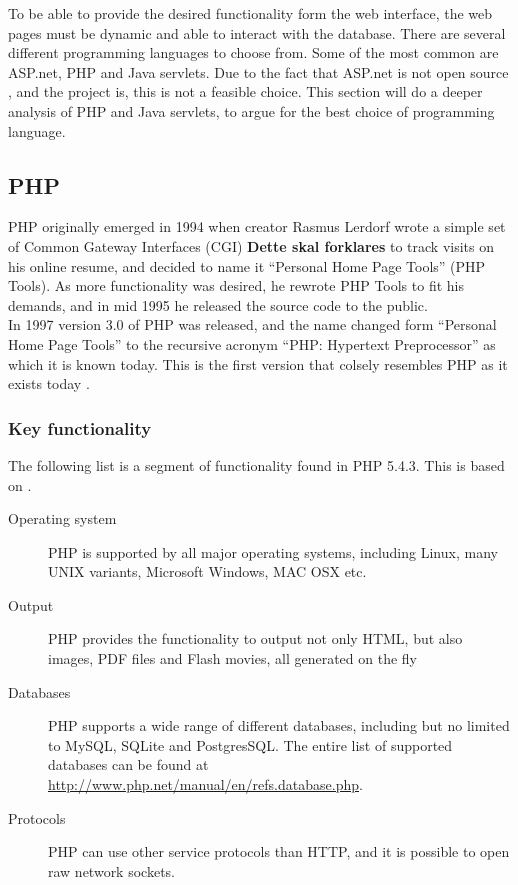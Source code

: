 To be able to provide the desired functionality form the web interface, the web pages must be dynamic and able to interact with the database. There are several different programming languages to choose from. Some of the most common are ASP.net, PHP and Java servlets. Due to the fact that ASP.net is not open source \cite{aspTerms}, and the project is, this is not a feasible choice. This section will do a deeper analysis of PHP and Java servlets, to argue for the best choice of programming language.

\subsection*{PHP}
PHP originally emerged in 1994 when creator Rasmus Lerdorf wrote a simple set of Common Gateway Interfaces (CGI) \textbf{Dette skal forklares} to track visits on his online resume, and decided to name it ``Personal Home Page Tools'' (PHP Tools). As more functionality was desired, he rewrote PHP Tools to fit his demands, and in mid 1995 he released the source code to the public.
\\In 1997 version 3.0 of PHP was released, and the name changed form ``Personal Home Page Tools'' to the recursive acronym ``PHP: Hypertext Preprocessor'' as which it is known today. This is the first version that colsely resembles PHP as it exists today \cite{phpHistory}.


\subsubsection*{Key functionality}

\noindent The following list is a segment of functionality found in PHP 5.4.3. This is based on \cite{phpFunctionality}.

\begin{description}
	\item[Operating system] PHP is supported by all major operating systems, including Linux, many UNIX variants, Microsoft Windows, MAC OSX etc.
	\item[Output] PHP provides the functionality to output not only HTML, but also images, PDF files and Flash movies, all generated on the fly
	\item[Databases] PHP supports a wide range of different databases, including but no limited to MySQL, SQLite and PostgresSQL. The entire list of supported databases can be found at \url{http://www.php.net/manual/en/refs.database.php}. 
	\item[Protocols] PHP can use other service protocols than HTTP, and it is possible to open raw network sockets.
\end{description}


